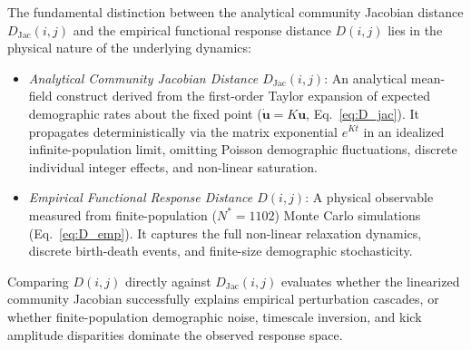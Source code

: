 \documentclass[twocolumn,amsmath,amssymb,aps,pra,10pt,floatfix,nofootinbib]{revtex4-2}
\begin{document}
The fundamental distinction between the analytical community Jacobian distance $D_{\text{Jac}}(i,j)$ and the empirical functional response distance $D(i,j)$ lies in the physical nature of the underlying dynamics:
\begin{itemize}
    \item \textit{Analytical Community Jacobian Distance $D_{\mathrm{Jac}}(i,j)$}: An analytical mean-field construct derived from the first-order Taylor expansion of expected demographic rates about the fixed point ($\dot{\mathbf{u}} = K\mathbf{u}$, Eq.~\eqref{eq:D_jac}). It propagates deterministically via the matrix exponential $e^{Kt}$ in an idealized infinite-population limit, omitting Poisson demographic fluctuations, discrete individual integer effects, and non-linear saturation.
    \item \textit{Empirical Functional Response Distance $D(i,j)$}: A physical observable measured from finite-population ($N^* = 1102$) Monte Carlo simulations (Eq.~\eqref{eq:D_emp}). It captures the full non-linear relaxation dynamics, discrete birth-death events, and finite-size demographic stochasticity.
\end{itemize}
Comparing $D(i,j)$ directly against $D_{\text{Jac}}(i,j)$ evaluates whether the linearized community Jacobian successfully explains empirical perturbation cascades, or whether finite-population demographic noise, timescale inversion, and kick amplitude disparities dominate the observed response space.


\end{document}
